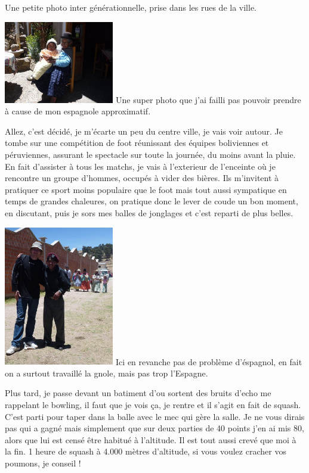 \begin{multicols}{2}
Une petite photo inter générationnelle, prise dans les rues de la ville.

\hspace*{-0.65cm}
\includegraphics[width=4.8cm]{articles/Arequipa-colca-titicaca/1256606974OTlv.jpg}
Une super photo que j'ai failli pas pouvoir prendre à cause de mon espagnole approximatif.

Allez, c'est décidé, je m'écarte un peu du centre ville, je vais voir autour. Je tombe sur une compétition de foot réunissant des équipes boliviennes et péruviennes, assurant le spectacle sur toute la journée, du moins avant la pluie. En fait d'assister à tous les matchs, je vais à l'exterieur de l'enceinte où je rencontre un groupe d'hommes, occupés à vider des bières. Ils m'invitent à pratiquer ce sport moins populaire que le foot mais tout aussi sympatique en temps de grandes chaleures, on pratique donc le lever de coude un bon moment, en discutant, puis je sors mes balles de jonglages et c'est reparti de plus belles.

\hspace*{-0.65cm}
\includegraphics[width=4.8cm]{articles/Arequipa-colca-titicaca/1256606985kcoP.jpg}
Ici en revanche pas de problème d'éspagnol, en fait on a surtout travaillé la gnole, mais pas trop l'Espagne.

Plus tard, je passe devant un batiment d'ou sortent des bruits d'echo me rappelant le bowling, il faut que je vois ça, je rentre et il s'agit en fait de squash. C'est parti pour taper dans la balle avec le mec qui gère la salle. Je ne vous dirais pas qui a gagné mais simplement que sur deux parties de 40 points j'en ai mis 80, alors que lui est censé être habitué à l'altitude. Il est tout aussi crevé que moi à la fin. 1 heure de squash à 4.000 mètres d'altitude, si vous voulez cracher vos poumons, je conseil !


\end{multicols}

